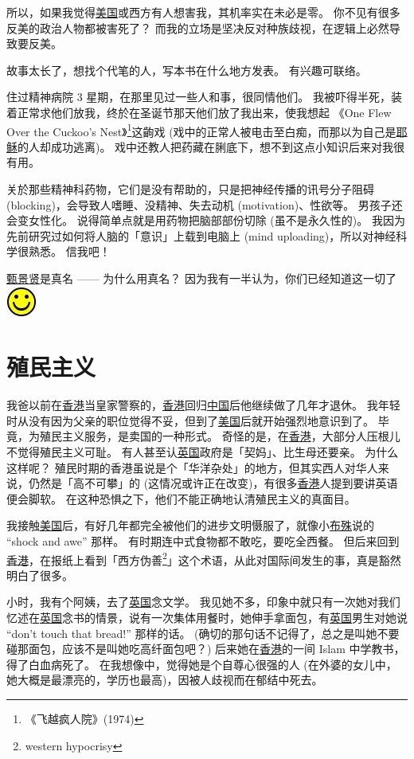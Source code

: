 \documentclass[12pt]{report}
\newcommand*\smiley{\includegraphics[scale=0.5]{smiley.jpg}}
\begin{document}
所以，如果我觉得\uline{美国}或西方有人想害我，其机率实在未必是零。 你不见有很多反美的政治人物都被害死了？ 而我的立场是坚决反对种族歧视，在逻辑上必然导致要反美。

故事太长了，想找个代笔的人，写本书在什么地方发表。 有兴趣可联络。

住过精神病院 3 星期，在那里见过一些人和事，很同情他们。 我被吓得半死，装着正常求他们放我，终於在圣诞节那天他们放了我出来，使我想起 《One Flew Over the Cuckoo's Nest》\footnote{《飞越疯人院》(1974)}这齣戏 (戏中的正常人被电击至白痴，而那以为自己是\uline{耶稣}的人却成功逃离)。 戏中还教人把药藏在脷底下，想不到这点小知识后来对我很有用。

关於那些精神科药物，它们是没有帮助的，只是把神经传播的讯号分子阻碍 (blocking)，会导致人嗜睡、没精神、失去动机 (motivation)、性欲等。 男孩子还会变女性化。 说得简单点就是用药物把脑部部份切除 (虽不是永久性的)。 我因为先前研究过如何将人脑的「意识」上载到电脑上 (mind uploading)，所以对神经科学很熟悉。 信我吧！

\uline{甄景贤}是真名 —— 为什么用真名？ 因为我有一半认为，你们已经知道这一切了 \smiley

\chapter{殖民主义}

我爸以前在\uline{香港}当皇家警察的，\uline{香港}回归\uline{中国}后他继续做了几年才退休。 我年轻时从没有因为父亲的职位觉得不妥，但到了\uline{美国}后就开始强烈地意识到了。 毕竟，为殖民主义服务，是卖国的一种形式。 奇怪的是，在\uline{香港}，大部分人压根儿不觉得殖民主义可耻。 有人甚至认\uline{英国}政府是「契妈」、比生母还要亲。 为什么这样呢？ 殖民时期的香港虽说是个「华洋杂处」的地方，但其实西人对华人来说，仍然是「高不可攀」的 (这情况或许正在改变)，有很多\uline{香港}人提到要讲英语便会脚软。 在这种恐惧之下，他们不能正确地认清殖民主义的真面目。

我接触\uline{美国}后，有好几年都完全被他们的进步文明慑服了，就像小\uline{布殊}说的 ``shock and awe'' 那样。 有时期连中式食物都不敢吃，要吃全西餐。 但后来回到\uline{香港}，在报纸上看到「西方伪善\footnote{western hypocrisy}」这个术语，从此对国际间发生的事，真是豁然明白了很多。

小时，我有个阿姨，去了\uline{英国}念文学。 我见她不多，印象中就只有一次她对我们忆述在\uline{英国}念书的情景，说有一次集体用餐时，她伸手拿面包，有\uline{英国}男生对她说 ``don't touch that bread!'' 那样的话。 (确切的那句话不记得了，总之是叫她不要碰那面包，应该不是叫她吃高纤面包吧？) 后来她在\uline{香港}的一间 Islam 中学教书，得了白血病死了。 在我想像中，觉得她是个自尊心很强的人 (在外婆的女儿中，她大概是最漂亮的，学历也最高)，因被人歧视而在郁结中死去。
\end{document}
